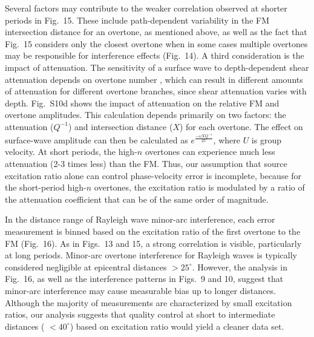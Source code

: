 \documentclass[extra,mreferee]{gji}
\begin{document}
Several factors may contribute to the weaker correlation observed at shorter periods in Fig.\ 15. These include path-dependent variability in the FM intersection distance for an overtone, as mentioned above, as well as the fact that Fig.\ 15 considers only the closest overtone when in some cases multiple overtones may be responsible for interference effects (Fig.\ 14). A third consideration is the impact of attenuation. The sensitivity of a surface wave to depth-dependent shear attenuation depends on overtone number \citep{dahlen1998theoretical}, which can result in different amounts of attenuation for different overtone branches, since shear attenuation varies with depth. Fig.\ S10d shows the impact of attenuation on the relative FM and overtone amplitudes. This calculation depends primarily on two factors: the attenuation ($Q^{-1}$) and intersection distance ($X$) for each overtone. The effect on surface-wave amplitude can then be calculated as $e^{\frac{-\omega X Q^{-1}}{2 U}}$, where $U$ is group velocity. At short periods, the high-$n$ overtones can experience much less attenuation (2-3 times less) than the FM. Thus, our assumption that source excitation ratio alone can control phase-velocity error is incomplete, because for the short-period high-$n$ overtones, the  excitation ratio is modulated by a ratio of the attenuation coefficient that can be of the same order of magnitude.

In the distance range of Rayleigh wave minor-arc interference, each error measurement is binned based on the excitation ratio of the first overtone to the FM (Fig.\ 16). As in Figs.\ 13 and 15, a strong correlation is visible, particularly at long periods. Minor-arc overtone interference for Rayleigh waves is typically considered negligible at epicentral distances $> 25^\circ$. However, the analysis in Fig.\ 16, as well as the interference patterns in Figs.\ 9 and 10, suggest that minor-arc interference may cause measurable bias up to longer distances. Although the majority of measurements are characterized by small excitation ratios, our analysis suggests that quality control at short to intermediate distances ( $ < 40^\circ$) based on excitation ratio would yield a cleaner data set. 
\end{document}
